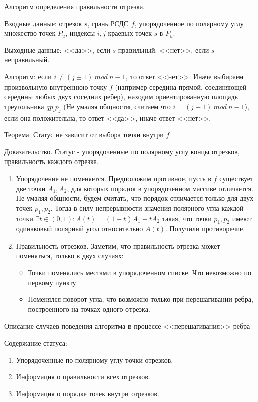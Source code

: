 \documentclass[letterpaper,12pt]{article}
\begin{document}
\begin{center}
      Алгоритм определения правильности отрезка.
\end{center}

Входные данные: отрезок $s$, грань РСДС $f$, упорядоченное по 
полярному углу множество точек $P_u$, индексы $i, j$ краевых точек $s$
в $P_u$.

Выходные данные: <<да>>, если $s$ правильный. <<нет>>, если $s$ 
неправильный.

Алгоритм: если $i \neq (j \pm 1) \ mod \ n-1$, то ответ <<нет>>. Иначе
выбираем произвольную внутреннюю точку $f$ (например середина прямой,
соединяющей середины любых двух соседних ребер), находим ориентированную
площадь треугольника $q p_i p_j$ (Не умаляя общности, считаем что
$i = (j - 1) \ mod \ n-1$), если она положительна, то ответ <<да>>, иначе
ответ <<нет>>.

\begin{center}
      Теорема. Статус не зависит от выбора точки внутри $f$
\end{center}
Доказательство.
Статус - упорядоченные по полярному углу концы отрезков, правильность каждого отрезка.
\begin{enumerate}
      \item Упорядочение не поменяется.
      Предположим противное, пусть в $f$ существует две точки $A_1, A_2$, для которых порядок в упорядоченном массиве отличается.
      Не умаляя общности, будем считать, что порядок отличается только для двух точек $p_1, p_2$.
      Тогда в силу непрерывности значения полярного угла каждой точки $\exists t \in (0, 1) : A(t) = (1 - t)A_1 + tA_2$
      такая, что точки $p_1, p_2$ имеют одинаковый полярный угол относительно $ A(t) $. Получили противоречие. 

      \item Правильность отрезков.
      Заметим, что правильность отрезка может поменяться, только в двух случаях:
      \begin{itemize}
            \item Точки поменялись местами в упорядоченном списке. Что невозможно по первому пункту.
            \item Поменялся поворот угла, что возможно только при перешагивании ребра, построенного на точках одного отрезка.
      \end{itemize}
\end{enumerate}

\hspace{4em}

\begin{center}
Описание случаев поведения алгоритма в процессе <<перешагивания>> ребра
\end{center}
Содержание статуса: 
\begin{enumerate}
      \item Упорядоченные по полярному углу точки отрезков.
      \item Информация о правильности всех отрезков.
      \item Информация о порядке точек внутри отрезков.
\end{enumerate}
\end{document}
